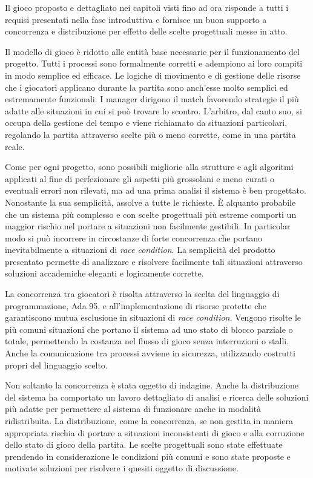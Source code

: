 \documentclass[aps,letterpaper,10pt]{article}
\begin{document}
Il gioco proposto e dettagliato nei capitoli visti fino ad ora risponde a tutti i requisi presentati nella fase
introduttiva e fornisce un buon supporto a concorrenza e distribuzione per effetto delle scelte progettuali messe in
atto. \vspace{3mm}

Il modello di gioco \`e ridotto alle entit\`a base necessarie per il funzionamento del progetto. Tutti i processi sono
formalmente corretti e adempiono ai loro compiti in modo semplice ed efficace. Le logiche di movimento e di gestione
delle risorse che i giocatori applicano durante la partita sono anch'esse molto semplici ed estremamente funzionali. I
manager dirigono il match favorendo strategie il pi\`u adatte alle situazioni in cui si pu\`o trovare lo scontro.
L'arbitro, dal canto suo, si occupa della gestione del tempo e viene richiamato da situazioni particolari, regolando la partita attraverso scelte pi\`u o meno corrette, come in una partita reale. \vspace{3mm}

Come per ogni progetto, sono possibili migliorie alla strutture e agli algoritmi applicati al fine di perfezionare gli
aspetti pi\`u grossolani e meno curati o eventuali errori non rilevati, ma ad una prima analisi il sistema \`e ben
progettato. Nonostante la sua semplicit\`a, assolve a tutte le richieste. \`E alquanto probabile che un sistema pi\`u
complesso e con scelte progettuali pi\`u estreme comporti un maggior rischio nel portare a situazioni non facilmente
gestibili. In particolar modo si pu\`o incorrere in circostanze di forte concorrenza che portano inevitabilmente a
situazioni di \emph{race condition}. La semplicit\`a del prodotto presentato permette di analizzare e risolvere
facilmente tali situazioni attraverso soluzioni accademiche eleganti e logicamente corrette. \vspace{3mm}

La concorrenza tra giocatori \`e risolta attraverso la scelta del linguaggio di programmazione, Ada 95, e
all'implementazione di risorse protette che garantiscono mutua esclusione in situazioni di \emph{race condition}. Vengono risolte le pi\`u comuni situazioni che portano il sistema ad uno stato di blocco parziale o totale, permettendo la costanza nel flusso di gioco senza interruzioni o stalli. Anche la comunicazione tra processi avviene in sicurezza, utilizzando costrutti propri del linguaggio scelto. \vspace{3mm}

Non soltanto la concorrenza \`e stata oggetto di indagine. Anche la distribuzione del sistema ha comportato un lavoro
dettagliato di analisi e ricerca delle soluzioni pi\`u adatte per permettere al sistema di funzionare anche in modalit\`a
ridistribuita. La distribuzione, come la concorrenza, se non gestita in maniera appropriata rischia di portare a
situazioni inconsistenti di gioco e alla corruzione dello stato di gioco della partita. Le scelte progettuali sono state effettuate prendendo in considerazione le condizioni pi\`u comuni e sono state proposte e motivate soluzioni per risolvere i quesiti oggetto di discussione. \vspace{3mm}
\end{document}
